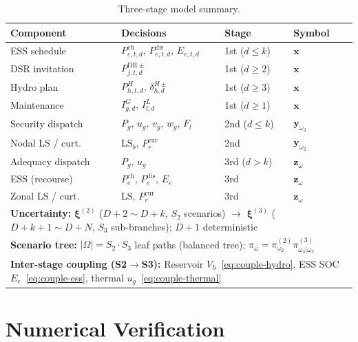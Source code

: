 \documentclass[11pt]{article}
\newcommand{\Pch}{P^{\mathrm{ch}}}
\newcommand{\Pdis}{P^{\mathrm{dis}}}
\newcommand{\LS}{\mathrm{LS}}
\begin{document}
\begin{table}[H]
\centering
\caption{Three-stage model summary.}
\label{tab:summary}
\small
\begin{tabular}{p{2.8cm}p{4.5cm}p{2cm}p{3cm}}
\toprule
\textbf{Component} & \textbf{Decisions}
  & \textbf{Stage} & \textbf{Symbol} \\
\midrule
ESS schedule & $\Pch_{e,t,d}$, $\Pdis_{e,t,d}$, $E_{e,t,d}$
  & 1st ($d{\leq}k$) & $\mathbf{x}$ \\
DSR invitation & $P^{\mathrm{DR}\pm}_{j,t,d}$
  & 1st ($d{\geq}2$) & $\mathbf{x}$ \\
Hydro plan & $P^{H}_{h,t,d}$, $\delta^{H\pm}_{h,d}$
  & 1st ($d{\geq}3$) & $\mathbf{x}$ \\
Maintenance & $I^{G}_{g,d}$, $I^{L}_{l,d}$
  & 1st ($d{\geq}1$) & $\mathbf{x}$ \\
\midrule
Security dispatch & $P_g$, $u_g$, $v_g$, $w_g$, $F_l$
  & 2nd ($d{\leq}k$) & $\mathbf{y}_{\omega_2}$ \\
Nodal LS / curt. & $\LS_b$, $P^{\mathrm{cur}}_r$
  & 2nd & $\mathbf{y}_{\omega_2}$ \\
\midrule
Adequacy dispatch & $P_g$, $u_g$
  & 3rd ($d{>}k$) & $\mathbf{z}_\omega$ \\
ESS (recourse) & $\Pch_e$, $\Pdis_e$, $E_e$
  & 3rd & $\mathbf{z}_\omega$ \\
Zonal LS / curt. & $\LS$, $P^{\mathrm{cur}}_r$
  & 3rd & $\mathbf{z}_\omega$ \\
\midrule
\multicolumn{4}{l}{\textbf{Uncertainty:}
  $\boldsymbol{\xi}^{(2)}$ ($D{+}2{\sim}D{+}k$, $S_2$ scenarios)
  $\to$ $\boldsymbol{\xi}^{(3)}$ ($D{+}k{+}1{\sim}D{+}N$,
  $S_3$ sub-branches); $D{+}1$ deterministic} \\
\multicolumn{4}{l}{\textbf{Scenario tree:}
  $|\Omega| = S_2 \cdot S_3$ leaf paths (balanced tree);
  $\pi_\omega = \pi^{(2)}_{\omega_2}
  \pi^{(3)}_{\omega_3|\omega_2}$} \\
\multicolumn{4}{l}{\textbf{Inter-stage coupling (S2$\to$S3):}
  Reservoir $V_h$~\eqref{eq:couple-hydro},
  ESS SOC $E_e$~\eqref{eq:couple-ess},
  thermal $u_g$~\eqref{eq:couple-thermal}} \\
\bottomrule
\end{tabular}
\end{table}

\section{Numerical Verification}\label{sec:numerical}
\end{document}
